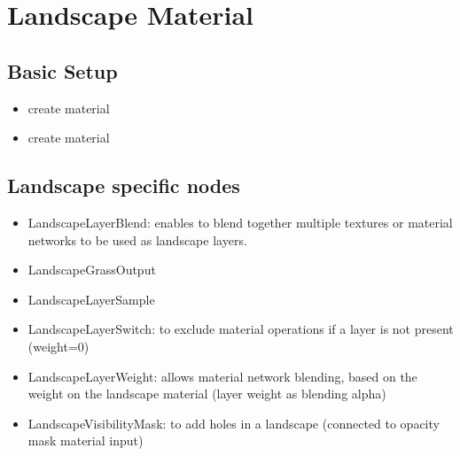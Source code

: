     \section{Landscape Material}
        \subsection{Basic Setup}
            \begin{itemize}
                \item create material
                \item create material
            \end{itemize}
        \subsection{Landscape specific nodes}
            \begin{itemize}
                \item LandscapeLayerBlend: enables to blend together multiple textures or material networks to be used as landscape layers.
                \item LandscapeGrassOutput
                \item LandscapeLayerSample
                \item LandscapeLayerSwitch: to exclude material operations if a layer is not present (weight=0)
                \item LandscapeLayerWeight: allows material network blending, based on the weight on the landscape material (layer weight as blending alpha)
                \item LandscapeVisibilityMask: to add holes in a landscape (connected to opacity mask material input)
            \end{itemize}

